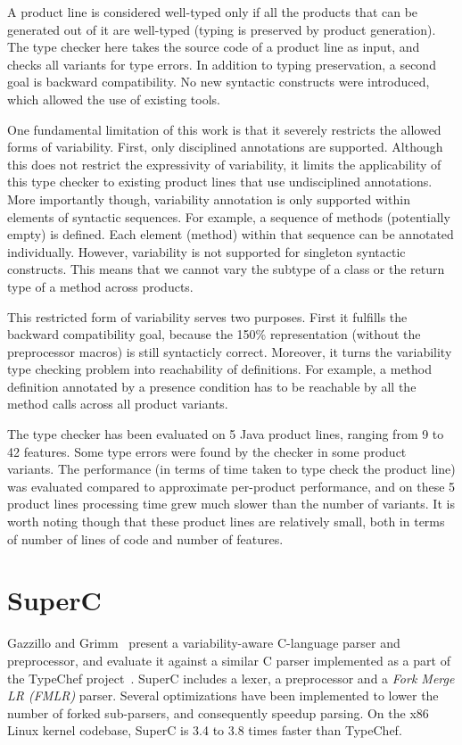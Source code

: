 \documentclass[11pt]{article}
\newcommand{\term}[1] {\emph{#1}}
\begin{document}
A product line is considered well-typed only if all the products that can be generated out of it are well-typed (typing is preserved by product generation). The type checker here takes the source code of a product line as input, and checks all variants for type errors. In addition to typing preservation, a second goal is backward compatibility. No new syntactic constructs were introduced, which allowed the use of existing tools.

One fundamental limitation of this work is that it severely restricts the allowed forms of variability. First, only disciplined annotations are supported. Although this does not restrict the expressivity of variability, it limits the applicability of this type checker to existing product lines that use undisciplined annotations. More importantly though, variability annotation is only supported within elements of syntactic sequences. For example, a sequence of methods (potentially empty) is defined. Each element (method) within that sequence can be annotated individually. However, variability is not supported for singleton syntactic constructs. This means that we cannot vary the subtype of a class or the return type of a method across products.

This restricted form of variability serves two purposes. First it fulfills the backward compatibility goal, because the 150\% representation (without the preprocessor macros) is still syntacticly correct. Moreover, it turns the variability type checking problem into reachability of definitions. For example, a method definition annotated by a presence condition has to be reachable by all the method calls across all product variants. 
 
The type checker has been evaluated on 5 Java product lines, ranging from 9 to 42 features. Some type errors were found by the checker in some product variants. The performance (in terms of time taken to type check the product line) was evaluated compared to approximate per-product performance, and on these 5 product lines processing time grew much slower than the number of variants. It is worth noting though that these product lines are relatively small, both in terms of number of lines of code and number of features. 

\section{SuperC}
Gazzillo and Grimm~\cite{Gazzillo:2012} present a variability-aware C-language parser and preprocessor, and evaluate it against a similar C parser implemented as a part of the TypeChef project~\cite{Kastner:2011, Kastner:2012}. SuperC includes a lexer, a preprocessor and a \term{Fork Merge LR (FMLR)} parser. Several optimizations have been implemented to lower the number of forked sub-parsers, and consequently speedup parsing. On the x86 Linux kernel codebase, SuperC is 3.4 to 3.8 times faster than TypeChef.
\end{document}
